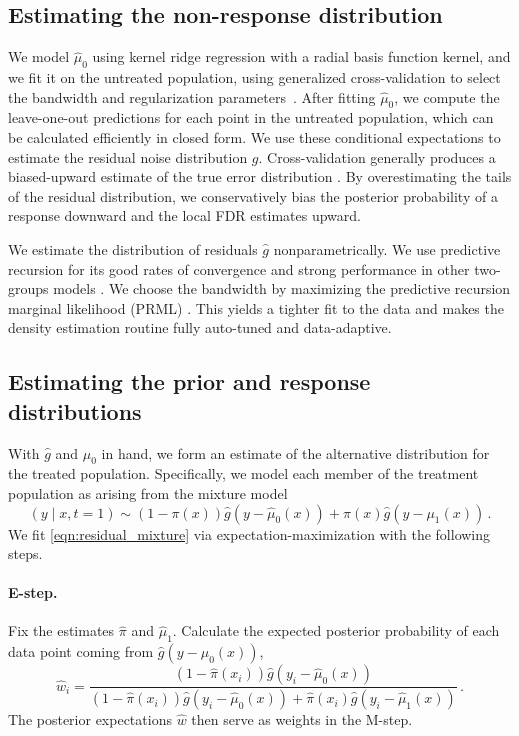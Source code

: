 \subsection{Estimating the non-response distribution}
\label{subsec:additive:null}
We model $\hat{\mu}_0$ using kernel ridge regression with a radial basis function kernel, and we fit it on the untreated population, using generalized cross-validation to select the bandwidth and regularization parameters~\citep{golub:etal:1979:gen-cv}. After fitting $\hat{\mu}_0$, we compute the leave-one-out predictions for each point in the untreated population, which can be calculated efficiently in closed form. We use these conditional expectations to estimate the residual noise distribution $g$. Cross-validation generally produces a biased-upward estimate of the true error distribution \citep{efron:gong:1983:leisurely-cv}. By overestimating the tails of the residual distribution, we conservatively bias the posterior probability of a response downward and the local FDR estimates upward.

We estimate the distribution of residuals $\hat{g}$ nonparametrically. We use predictive recursion \citep{martin:tokdar:2009:predictive-recursion} for its good rates of convergence and strong performance in other two-groups models \citep{scott:etal:2014:fdr-regression,tansey:etal:2018:fdr-smoothing}.
We choose the bandwidth by maximizing the predictive recursion marginal likelihood (PRML) \citep{martin:tokdar:2011:pr-marginal-likelihood}. This yields a tighter fit to the data and makes the density estimation routine fully auto-tuned and data-adaptive.

\subsection{Estimating the prior and response distributions}
\label{subsec:additive:alternative}
With $\hat{g}$ and $\hat{\mu}_0$ in hand, we form an estimate of the alternative distribution for the treated population. Specifically, we model each member of the treatment population as arising from the mixture model
\begin{equation}
\label{eqn:residual_mixture}
(y \mid x, t=1) \sim (1-\pi(x)) \hat{g}(y - \hat{\mu}_0(x)) + \pi(x) \hat{g}(y - \mu_1(x)) \, .
\end{equation}
We fit \cref{eqn:residual_mixture} via expectation-maximization with the following steps.

\paragraph{E-step.} Fix the estimates $\hat{\pi}$ and $\hat{\mu}_1$. Calculate the expected posterior probability of each data point coming from $\hat{g}(y - \mu_0(x))$,
\begin{equation*}
\label{eqn:additive_e_step}
\hat{w}_i = \frac{(1-\hat{\pi}(x_i)) \hat{g}(y_i - \hat{\mu}_0(x))}{(1-\hat{\pi}(x_i)) \hat{g}(y_i - \hat{\mu}_0(x)) + \hat{\pi}(x_i) \hat{g}(y_i - \hat{\mu}_1(x))} \, .
\end{equation*}
The posterior expectations $\hat{w}$ then serve as weights in the M-step.

